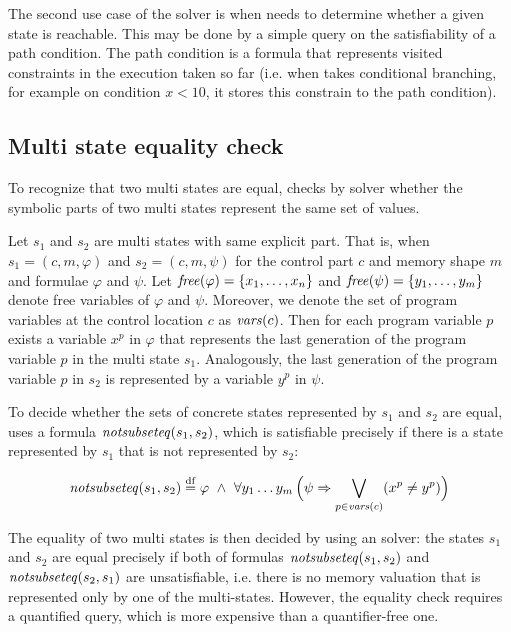 The second use case of the \SMT solver is when \SymDIVINE needs to determine
whether a given state is reachable. This may be done by a simple query on the
satisfiability of a path condition. The path condition is a formula that
represents visited constraints in the execution taken so far (i.e.  when
\SymDIVINE takes conditional branching, for example on condition $x < 10$, it
stores this constrain to the path condition).

\subsection{Multi state equality check}\label{subsec:equality}

To recognize that two multi states are equal, \SymDIVINE checks by \SMT solver
whether the symbolic parts of two multi states represent the same set of values.

Let $s_1$ and $s_2$ are multi states with same explicit part. That is, when $s_1
= (c, m, \varphi)$ and $s_2 = (c, m, \psi)$ for the control part $c$ and memory
shape $m$ and formulae $\varphi$ and $\psi$. Let $\mathit{free}(\varphi) = \{x_1, \dots,
x_n\}$ and $\mathit{free}(\psi) = \{ y_1, \dots, y_m\}$ denote free variables of
$\varphi$ and $\psi$. Moreover, we denote the set of program variables at the
control location $c$ as $\mathit{vars}(c)$. Then for each program variable $p$ exists a
variable $x^p$ in $\varphi$ that represents the last generation of the program
variable $p$ in the multi state $s_1$. Analogously, the last generation of the
program variable $p$ in $s_2$ is represented by a variable $y^p$ in $\psi$.

To decide whether the sets of concrete states represented by $s_1$ and $s_2$ are
equal, \SymDIVINE uses a formula $\mathit{notsubseteq}(s_1, s_2)$, which is satisfiable
precisely if there is a state represented by $s_1$ that is not represented by
$s_2$:

\[
  \mathit{notsubseteq}(s_1, s_2) \stackrel{\mathrm{df}}{=} \varphi~\land~ \forall y_1 \ldots y_m
  \, \Big ( \psi \Rightarrow \bigvee_{p \in \mathit{vars}(c)} (x^p \not =
  y^p) \Big)
\]

The equality of two multi states is then decided by using an \SMT solver: the
states $s_1$ and $s_2$ are equal precisely if both of formulas
$\mathit{notsubseteq}(s_1, s_2)$ and $\mathit{notsubseteq}(s_2, s_1)$ are unsatisfiable, i.e.
there is no memory valuation that is represented only by one of the
multi-states. However, the equality check requires a quantified \SMT query,
which is more expensive than a quantifier-free one.

